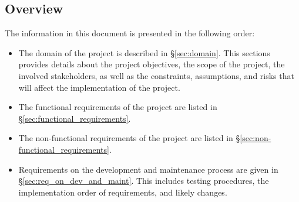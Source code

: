 \documentclass[english]{article}
\begin{document}
\subsection{Overview}
The information in this document is presented in the following order:
\begin{itemize} 
\item The domain of the project is described in \hyperref[sec:domain]{\S\ref*{sec:domain}}.  This sections provides details about the project objectives, the scope of the project, the involved stakeholders, as well as the constraints, assumptions, and risks that will affect the implementation of the project.

\item The functional requirements of the project are listed in \hyperref[sec:functional_requirements]{\S\ref*{sec:functional_requirements}}.
\item The non-functional requirements of the project are listed in \hyperref[sec:non-functional_requirements]{\S\ref*{sec:non-functional_requirements}}.
\item Requirements on the development and maintenance process are given in \hyperref[sec:req_on_dev_and_maint]{\S\ref*{sec:req_on_dev_and_maint}}.  This includes testing procedures, the implementation order of requirements, and likely changes.
\end{itemize}
\end{document}
